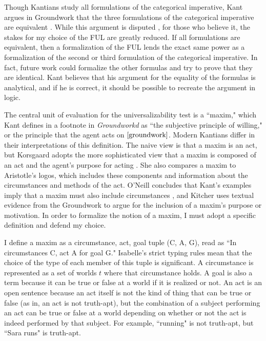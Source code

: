 \begin{isabellebody}
\begin{isamarkuptext}
Though Kantians study all formulations of the categorical imperative, Kant argues in Groundwork 
that the three formulations of the categorical imperative are equivalent \cite{groundwork}. While this 
argument is disputed \cite{sepkant}, for those who believe it, the
stakes for my choice of the FUL are greatly reduced. If all formulations are equivalent, then a formalization of the FUL
lends the exact same power as a formalization of the second or third formulation of the categorical 
imperative. In fact, future work could formalize the other formulas and try to prove that they 
are identical. Kant believes that his argument for the equality of the formulas is analytical, and
if he is correct, it should be possible to recreate the argument in logic.%
\end{isamarkuptext}\isamarkuptrue%
%
\isadelimdocument
%
\endisadelimdocument
%
\isatagdocument
%
\isamarkuptrue%
%
\endisatagdocument
{\isafolddocument}%
%
\isadelimdocument
%
\endisadelimdocument
%
\begin{isamarkuptext}%
The central unit of evaluation for the universalizability test is a ``maxim," which Kant defines 
in a footnote in \emph{Groundworkd} as ``the subjective principle of willing," or the principle that 
the agent acts on $\cite[16]{groundwork}$. Modern Kantians differ in their interpretations of this definition. The naive view 
is that a maxim is an act, but Korsgaard adopts the more sophisticated view that a maxim is composed
of an act and the agent's purpose for acting \cite{actingforareason}. She also compares a maxim 
to Aristotle's logos, which includes these components and information about the circumstances and methods 
of the act. O'Neill concludes that Kant's examples imply that a maxim must also include circumstances \cite{actingonprinciple}, and 
Kitcher \cite{whatisamaxim} uses textual evidence from the Groundwork to argue for the inclusion of a maxim's purpose 
or motivation. In order to formalize the notion of a maxim, I must adopt a specific definition and 
defend my choice.

I define a maxim as a circumstance, act, goal tuple (C, A, G), read 
as ``In circumstances C, act A for goal G." Isabelle's strict typing rules mean that the choice of the 
type of each member of this tuple is significant. A circumstance is represented as a set of worlds 
$t$ where that circumstance holds. A goal is also a term because it can be true or false at a world if it 
is realized or not. An act is an open sentence because an act itself is not the kind of thing that can 
be true or false (as in, an act is not truth-apt), but the combination of a subject performing an act 
can be true or false at a world depending on whether or not the act is indeed performed by that subject. 
For example, ``running" is not truth-apt, but ``Sara runs" is truth-apt.


\end{isamarkuptext}
\end{isabellebody}
